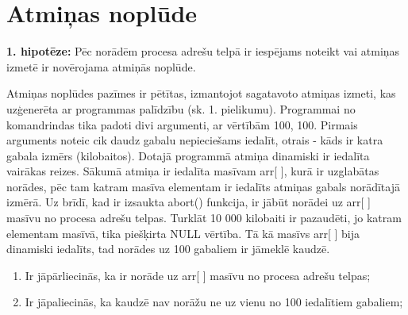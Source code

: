 ﻿
\section{Atmiņas noplūde}
 


\textbf{1. hipotēze:} Pēc norādēm procesa adrešu telpā ir iespējams noteikt vai atmiņas izmetē ir novērojama atmiņās noplūde.

Atmiņas noplūdes pazīmes ir pētītas, izmantojot sagatavoto atmiņas izmeti, kas uzģenerēta ar programmas palīdzību (sk. 1. pielikumu).
Programmai no komandrindas tika padoti divi argumenti, ar vērtībām 100, 100.
Pirmais arguments noteic cik daudz gabalu nepieciešams iedalīt, otrais - kāds ir katra gabala izmērs (kilobaitos).
Dotajā programmā atmiņa dinamiski ir iedalīta vairākas reizes. 
Sākumā atmiņa ir iedalīta masīvam arr[ ], kurā ir uzglabātas norādes, pēc tam katram masīva elementam ir iedalīts atmiņas gabals norādītajā izmērā.
Uz brīdī, kad ir izsaukta abort() funkcija, ir jābūt norādei uz arr[ ] masīvu no procesa adrešu telpas.
Turklāt 10 000 kilobaiti ir pazaudēti, jo  katram elementam masīvā, tika piešķirta NULL vērtība. 
Tā kā masīvs arr[ ] bija dinamiski iedalīts, tad norādes uz 100 gabaliem ir jāmeklē kaudzē.
\begin{enumerate}
\item Ir jāpārliecinās, ka ir norāde uz arr[ ] masīvu no procesa adrešu telpas;
\item Ir jāpaliecinās, ka kaudzē nav norāžu ne uz vienu no 100 iedalītiem gabaliem;
\end{enumerate}

